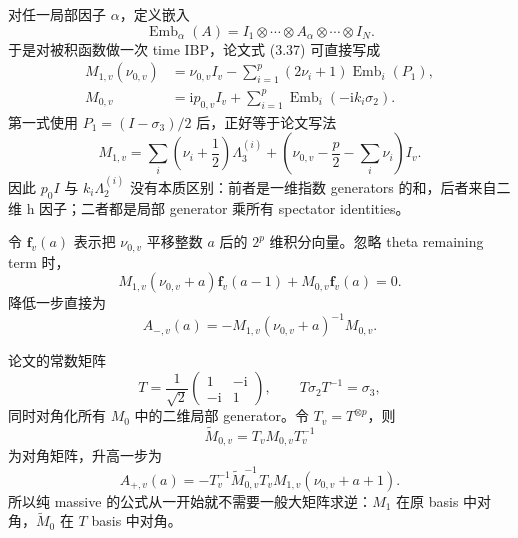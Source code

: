 \documentclass[11pt,a4paper]{ctexart}
\newcommand{\ii}{\mathrm i}
\newcommand{\Emb}{\operatorname{Emb}}
\begin{document}
对任一局部因子 $\alpha$，定义嵌入
\begin{equation}
 \Emb_\alpha(A)
 =I_1\otimes\cdots\otimes A_\alpha\otimes\cdots\otimes I_N.
 \label{eq:embedding-definition}
\end{equation}
于是对被积函数做一次 time IBP，论文式 (3.37) 可直接写成
\begin{align}
 M_{1,v}(\nu_{0,v})
 &=\nu_{0,v}I_v
 -\sum_{i=1}^{p}(2\nu_i+1)\Emb_i(P_1),
 \label{eq:massive-M1-projector}\\
 M_{0,v}
 &=\ii p_{0,v}I_v
 +\sum_{i=1}^{p}\Emb_i(-\ii k_i\sigma_2).
 \label{eq:massive-M0-kronecker}
\end{align}
第一式使用 $P_1=(I-\sigma_3)/2$ 后，正好等于论文写法
\begin{equation}
 M_{1,v}
 =\sum_i\left(\nu_i+\frac12\right)\Lambda_3^{(i)}
 +\left(\nu_{0,v}-\frac p2-\sum_i\nu_i\right)I_v.
\end{equation}
因此 $p_0I$ 与 $k_i\Lambda_2^{(i)}$ 没有本质区别：前者是一维指数 generators 的和，后者来自二维 h 因子；二者都是局部 generator 乘所有 spectator identities。

令 $\bm f_v(a)$ 表示把 $\nu_{0,v}$ 平移整数 $a$ 后的 $2^p$ 维积分向量。忽略 theta remaining term 时，
\begin{equation}
 M_{1,v}(\nu_{0,v}+a)\bm f_v(a-1)
 +M_{0,v}\bm f_v(a)=0.
 \label{eq:massive-vertex-ibp}
\end{equation}
降低一步直接为
\begin{equation}
 A_{-,v}(a)
 =-M_{1,v}(\nu_{0,v}+a)^{-1}M_{0,v}.
 \label{eq:Aminus-local}
\end{equation}

论文的常数矩阵
\begin{equation}
 T=\frac1{\sqrt2}
 \begin{pmatrix}1&-\ii\\-\ii&1\end{pmatrix},
 \qquad
 T\sigma_2T^{-1}=\sigma_3,
 \label{eq:paper-T}
\end{equation}
同时对角化所有 $M_0$ 中的二维局部 generator。令 $T_v=T^{\otimes p}$，则
\begin{equation}
 \widetilde M_{0,v}=T_vM_{0,v}T_v^{-1}
\end{equation}
为对角矩阵，升高一步为
\begin{equation}
 A_{+,v}(a)
 =-T_v^{-1}\widetilde M_{0,v}^{-1}T_v
 M_{1,v}(\nu_{0,v}+a+1).
 \label{eq:Aplus-local}
\end{equation}
所以纯 massive 的公式从一开始就不需要一般大矩阵求逆：$M_1$ 在原 basis 中对角，$\widetilde M_0$ 在 $T$ basis 中对角。
\end{document}
